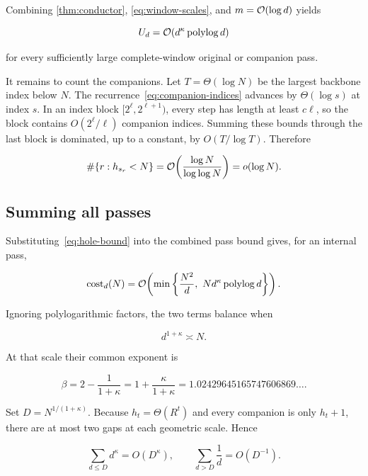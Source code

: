 Combining \cref{thm:conductor}, \eqref{eq:window-scales}, and
$m=\mathcal{O}(\log d)$ yields

\begin{equation}
  U_d=\mathcal{O}(d^\kappa\operatorname{polylog} d)
  \label{eq:hole-bound}
\end{equation}

for every sufficiently large complete-window original or companion pass.

It remains to count the companions.  Let $T=\Theta(\log N)$ be the largest
backbone index below $N$.  The recurrence~\eqref{eq:companion-indices} advances
by $\Theta(\log s)$ at index $s$.  In an index block
$[2^\ell,2^{\ell+1})$, every step has length at least $c\ell$, so the block
contains $O(2^\ell/\ell)$ companion indices.  Summing these bounds through the
last block is dominated, up to a constant, by $O(T/\log T)$.  Therefore

\begin{equation}
  \#\{r:h_{s_r}<N\}
  =\mathcal{O}\!\left(\frac{\log N}{\log\log N}\right)
  =o(\log N).
  \label{eq:companion-count}
\end{equation}

\subsection{Summing all passes}

Substituting~\eqref{eq:hole-bound} into the combined pass bound gives, for an
internal pass,

\begin{equation}
  \operatorname{cost}_d(N)=\mathcal{O}\!\left(
    \min\left\{\frac{N^2}{d},\ Nd^\kappa\operatorname{polylog} d\right\}
  \right).
  \label{eq:internal-pass}
\end{equation}

Ignoring polylogarithmic factors, the two terms balance when

\[
  d^{1+\kappa}\asymp N.
\]

At that scale their common exponent is

\begin{equation}
  \beta
  =2-\frac1{1+\kappa}
  =1+\frac{\kappa}{1+\kappa}
  =1.02429645165747606869\ldots.
  \label{eq:final-exponent}
\end{equation}

Set $D=N^{1/(1+\kappa)}$.  Because $h_t=\Theta(R^t)$ and every companion is
only $h_t+1$, there are at most two gaps at each geometric scale.  Hence

\begin{equation}
  \sum_{d\le D}d^\kappa=O(D^\kappa),
  \qquad
  \sum_{d>D}\frac1d=O(D^{-1}).
  \label{eq:appendix-geometric-sums}
\end{equation}

